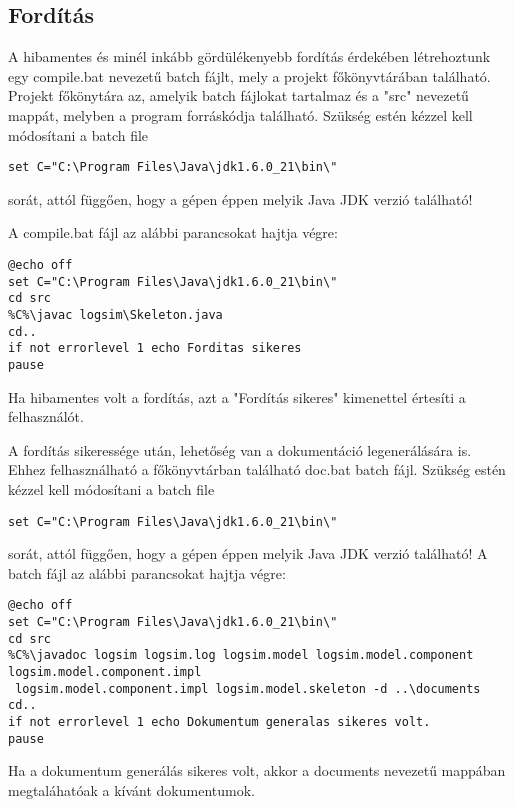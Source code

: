 \subsection{Fordítás}
A hibamentes és minél inkább gördülékenyebb fordítás érdekében létrehoztunk egy compile.bat nevezetű batch fájlt, mely a projekt főkönyvtárában található. Projekt főkönytára az, amelyik batch fájlokat tartalmaz és a "src" nevezetű mappát, melyben a program forráskódja található. Szükség estén kézzel kell módosítani a batch file 
\begin{verbatim}
set C="C:\Program Files\Java\jdk1.6.0_21\bin\" 
\end{verbatim}
sorát, attól függően, hogy a gépen éppen melyik Java JDK verzió található!

A compile.bat fájl az alábbi parancsokat hajtja végre:
\lstset{escapeinside=`', xleftmargin=10pt, frame=single, basicstyle=\ttfamily\footnotesize, language=sh}
\begin{lstlisting}
@echo off
set C="C:\Program Files\Java\jdk1.6.0_21\bin\"
cd src
%C%\javac logsim\Skeleton.java
cd..
if not errorlevel 1 echo Forditas sikeres
pause
\end{lstlisting}
Ha hibamentes volt a fordítás, azt a "Fordítás sikeres" kimenettel értesíti a felhasználót.



A fordítás sikeressége után, lehetőség van a dokumentáció legenerálására is. Ehhez felhasználható a főkönyvtárban található doc.bat batch fájl.
Szükség estén kézzel kell módosítani a batch file \begin{verbatim}
set C="C:\Program Files\Java\jdk1.6.0_21\bin\" 
\end{verbatim}
sorát, attól függően, hogy a gépen éppen melyik Java JDK verzió található!
A batch fájl az alábbi parancsokat hajtja végre:
\lstset{escapeinside=`', xleftmargin=10pt, frame=single, basicstyle=\ttfamily\footnotesize, language=sh}
\begin{lstlisting}
@echo off
set C="C:\Program Files\Java\jdk1.6.0_21\bin\"
cd src
%C%\javadoc logsim logsim.log logsim.model logsim.model.component logsim.model.component.impl 
 logsim.model.component.impl logsim.model.skeleton -d ..\documents
cd..
if not errorlevel 1 echo Dokumentum generalas sikeres volt. 
pause
\end{lstlisting}
Ha a dokumentum generálás sikeres volt, akkor a documents nevezetű mappában megtaláhatóak a kívánt dokumentumok.




